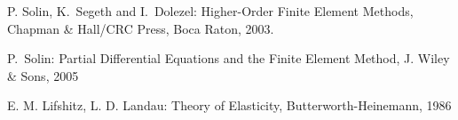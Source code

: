 \begin{thebibliography}{1}


P. Solin, K.~Segeth and I.~Dolezel:
{ Higher-Order Finite Element Methods},
Chapman \& Hall/CRC Press, Boca Raton, 2003.

P.~Solin: Partial Differential Equations and the Finite Element Method,
J. Wiley \& Sons, 2005

E. M. Lifshitz, L. D. Landau:
Theory of Elasticity,
Butterworth-Heinemann, 1986




\end{thebibliography}
